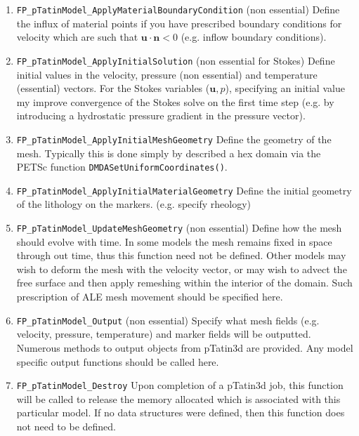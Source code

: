 \documentclass[paper=a4, fontsize=11pt,twoside]{scrartcl}
\newcommand{\ptat}{{pTatin3d}}
\newcommand{\unix}[1]{\texttt{\footnotesize #1}}
\begin{document}
{{\begin{enumerate}
	\item \unix{FP\_pTatinModel\_ApplyMaterialBoundaryCondition} (non essential)
	Define the influx of material points if you have prescribed boundary conditions for velocity which are such that $\boldsymbol u \cdot \boldsymbol n < 0$ (e.g. inflow boundary conditions).

	\item \unix{FP\_pTatinModel\_ApplyInitialSolution} (non essential for Stokes)
	Define initial values in the velocity, pressure (non essential) and temperature (essential) vectors. For the Stokes variables ($\boldsymbol u,p$), specifying an initial value my improve convergence of the Stokes solve on the first time step (e.g. by introducing a hydrostatic pressure gradient in the pressure vector).
	
	\item \unix{FP\_pTatinModel\_ApplyInitialMeshGeometry}
	Define the geometry of the mesh. Typically this is done simply by described a hex domain via the PETSc function \unix{DMDASetUniformCoordinates()}.

	\item \unix{FP\_pTatinModel\_ApplyInitialMaterialGeometry}
	Define the initial geometry of the lithology on the markers. (e.g. specify rheology)

	\item \unix{FP\_pTatinModel\_UpdateMeshGeometry} (non essential)
	Define how the mesh should evolve with time. In some models the mesh remains fixed in space through out time, thus this function need not be defined. Other models may wish to deform the mesh with the velocity vector, or may wish to advect the free surface and then apply remeshing within the interior of the domain. Such prescription of ALE mesh movement should be specified here.

	\item \unix{FP\_pTatinModel\_Output} (non essential)
	Specify what mesh fields (e.g. velocity, pressure, temperature) and marker fields will be outputted. Numerous
	methods to output objects from {\ptat} are provided. Any model specific output functions should be called here.

	\item \unix{FP\_pTatinModel\_Destroy} 
	Upon completion of a {\ptat} job, this function will be called to release the memory allocated which is associated 
	with this particular model. If no data structures were defined, then this function does not need to be defined.
\end{enumerate}


}}
\end{document}
